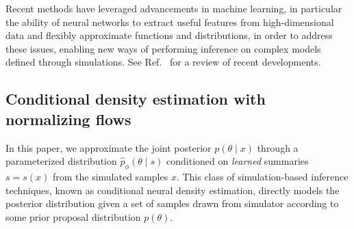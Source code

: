 \documentclass[prd,aps,10pt,nofootinbib,twocolumn,superscriptaddress,preprintnumbers,balancelastpage,longbibliography]{revtex4-1}
\begin{document}
Recent methods have leveraged advancements in machine learning, in particular the ability of neural networks to extract useful features from high-dimensional data and flexibly approximate functions and distributions, in order to address these issues, enabling new ways of performing inference on complex models defined through simulations. See Ref.~\cite{cranmer2020frontier} for a review of recent developments.

\subsection{Conditional density estimation with normalizing flows}

In this paper, we approximate the joint posterior $p(\theta\mid x)$ through a parameterized distribution $\hat p_\phi(\theta\mid s)$ conditioned on \emph{learned} summaries $s=s(x)$ from the simulated samples $x$. This class of simulation-based inference techniques, known as conditional neural density estimation, directly models the posterior distribution given a set of samples drawn from simulator according to some prior proposal distribution $p(\theta)$.
\end{document}
